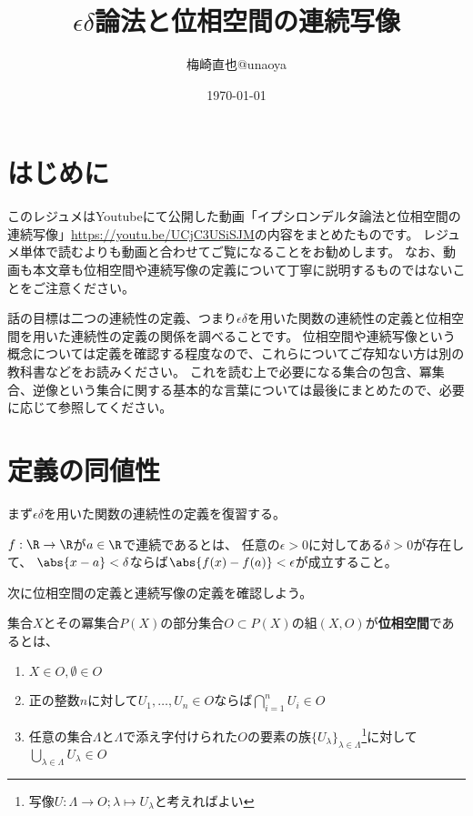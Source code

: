 \documentclass[uplatex]{jsarticle}
\title{$\epsilon\delta$論法と位相空間の連続写像}
\author{梅崎直也@unaoya}
\date{\today}
\begin{document}
\maketitle

\section{はじめに}
このレジュメはYoutubeにて公開した動画「イプシロンデルタ論法と位相空間の連続写像」\url{https://youtu.be/UCjC3USiSJM}の内容をまとめたものです。
レジュメ単体で読むよりも動画と合わせてご覧になることをお勧めします。
なお、動画も本文章も位相空間や連続写像の定義について丁寧に説明するものではないことをご注意ください。

話の目標は二つの連続性の定義、つまり$\epsilon\delta$を用いた関数の連続性の定義と位相空間を用いた連続性の定義の関係を調べることです。
位相空間や連続写像という概念については定義を確認する程度なので、これらについてご存知ない方は別の教科書などをお読みください。
これを読む上で必要になる集合の包含、冪集合、逆像という集合に関する基本的な言葉については最後にまとめたので、必要に応じて参照してください。

\section{定義の同値性}
まず$\epsilon\delta$を用いた関数の連続性の定義を復習する。

\begin{dfn}[関数の連続性]\label{point}
  $f:\R \to \R$が$a\in\R$で連続であるとは、
  任意の$\epsilon>0$に対してある$\delta>0$が存在して、
  $\abs{x-a}<\delta$ならば$\abs{f(x)-f(a)}<\epsilon$が成立すること。
\end{dfn}

次に位相空間の定義と連続写像の定義を確認しよう。

\begin{dfn}[位相空間]
  集合$X$とその冪集合$P(X)$の部分集合$O\subset P(X)$の組$(X,O)$が\textbf{位相空間}であるとは、
  \begin{enumerate}
  \item $X\in O, \emptyset\in O$
  \item 正の整数$n$に対して$U_1,\ldots,U_n\in O$ならば$\bigcap_{i=1}^n U_i\in O$
  \item 任意の集合$\Lambda$と$\Lambda$で添え字付けられた$O$の要素の族$\{U_\lambda\}_{\lambda\in\Lambda}$\footnote{写像$U:\Lambda\to O; \lambda\mapsto U_\lambda$と考えればよい}に対して$\bigcup_{\lambda\in\Lambda}U_\lambda\in O$
  \end{enumerate}
\end{dfn}
\end{document}
